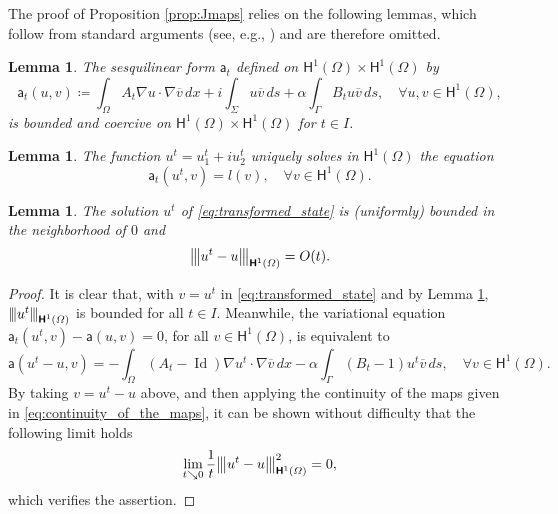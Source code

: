 \documentclass[a4paper,11pt]{article}
\newtheorem{lemma}[theorem]{Lemma}
\newcommand{\vect}[1]{\boldsymbol{\mathbf{#1}}}
\newcommand{\vertiii}[1]{{\left\vert\kern-0.25ex\left\vert\kern-0.25ex\left\vert #1 
    \right\vert\kern-0.25ex\right\vert\kern-0.25ex\right\vert}}
\newcommand{\cv}{\overline{v}}
\newcommand{\ui}{u_{2}}
\newcommand{\Id}{\operatorname{Id}}
\newcommand{\intervalI}{I}
\newcommand{\aaa}{{\mathsf{a}}}
\newcommand{\aat}{{\mathsf{a}}_t}
\newcommand{\HH}{\vect{\mathsf{H}}}
\newcommand{\intO}[1]{\int_{\varOmega}{#1}{\, {d}{x}}}
\newcommand{\intS}[1]{\int_{\varSigma}{#1}{\, {d}{s}}}
\newcommand{\intG}[1]{\int_{\varGamma}{#1}{\, {d}{s}}}
\begin{document}
The proof of Proposition \ref{prop:Jmaps} relies on the following lemmas, which follow from standard arguments (see, e.g., \cite{Rabago2023b}) and are therefore omitted.
\begin{lemma}\label{lem:sesquiliner_form}
	The sesquilinear form $\aat$ defined on $\HH^{1}(\varOmega) \times \HH^{1}(\varOmega)$ by
	\[
		\aat({u},{v}) \coloneqq \intO{A_t \nabla {u} \cdot \nabla {\cv}} + i \intS{{u} {\cv}} + \alpha \intG{B_t {u} {\cv}}, \quad \forall {u}, {v} \in \HH^{1}(\varOmega),
	\]
	is bounded and coercive on $\HH^{1}(\varOmega) \times \HH^{1}(\varOmega)$ for $t \in \intervalI$.
\end{lemma} 
\begin{lemma}
	\label{lem:transported_problem}
	The function $u^{t}=u_{1}^{t} + i \ui^{t}$ uniquely solves in $\HH^{1}(\varOmega)$ the equation
	\begin{equation}\label{eq:transformed_state}
		\aat({u^{t}},{v}) = l({v}), \quad \forall {v} \in \HH^{1}(\varOmega).	
	\end{equation}
\end{lemma}	
\begin{lemma}\label{lem:holder_continuity}
	The solution ${u^{t}}$ of \eqref{eq:transformed_state} is (uniformly) bounded in the neighborhood of $0$ and 
	\[
		\vertiii{u^{t} - u}_{\HH^{1}(\varOmega)} = O(t).
	\] 
\end{lemma}
\begin{proof}
	It is clear that, with $v = u^{t}$ in \eqref{eq:transformed_state} and by Lemma \ref{lem:sesquiliner_form}, $\vertiii{u^{t}}_{\HH^{1}(\varOmega)}$ is bounded for all $t\in \intervalI$.
	Meanwhile, the variational equation $\aat(u^{t},v) - \aaa(u,v) = 0$, for all ${v} \in \HH^{1}(\varOmega)$, is equivalent to
	\begin{equation}\label{eq:difference_equation}
	\aaa(u^{t} - u, v) = - \intO{(A_{t} - \Id) \nabla {u^{t}} \cdot \nabla {\cv}} - \alpha \intG{ (B_{t} - 1) {u^{t}} {\cv}},\quad \forall {v} \in \HH^{1}(\varOmega).
	\end{equation}
	By taking $v = u^{t} - u$ above, and then applying the continuity of the maps given in \eqref{eq:continuity_of_the_maps}, it can be shown without difficulty that the following limit holds
	\[
		\lim_{t \searrow 0} \frac{1}{t} \vertiii{u^{t} - u}_{\HH^{1}(\varOmega)}^{2} = 0,	
	\]
	which verifies the assertion.
\end{proof}
\end{document}
